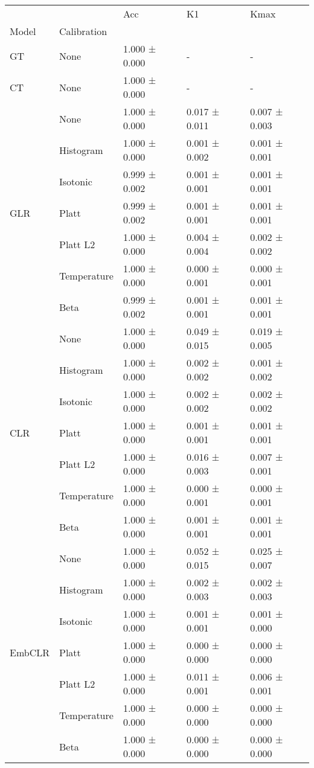 \begin{tabular}{lllll}
\toprule
 &  & Acc & K1 & Kmax \\
Model & Calibration &  &  &  \\
\midrule
GT & None & 1.000 ± 0.000 & - & - \\
\cline{1-5}
CT & None & 1.000 ± 0.000 & - & - \\
\cline{1-5}
\multirow[t]{7}{*}{GLR} & None & 1.000 ± 0.000 & 0.017 ± 0.011 & 0.007 ± 0.003 \\
 & Histogram & 1.000 ± 0.000 & 0.001 ± 0.002 & 0.001 ± 0.001 \\
 & Isotonic & 0.999 ± 0.002 & 0.001 ± 0.001 & 0.001 ± 0.001 \\
 & Platt & 0.999 ± 0.002 & 0.001 ± 0.001 & 0.001 ± 0.001 \\
 & Platt L2 & 1.000 ± 0.000 & 0.004 ± 0.004 & 0.002 ± 0.002 \\
 & Temperature & 1.000 ± 0.000 & 0.000 ± 0.001 & 0.000 ± 0.001 \\
 & Beta & 0.999 ± 0.002 & 0.001 ± 0.001 & 0.001 ± 0.001 \\
\cline{1-5}
\multirow[t]{7}{*}{CLR} & None & 1.000 ± 0.000 & 0.049 ± 0.015 & 0.019 ± 0.005 \\
 & Histogram & 1.000 ± 0.000 & 0.002 ± 0.002 & 0.001 ± 0.002 \\
 & Isotonic & 1.000 ± 0.000 & 0.002 ± 0.002 & 0.002 ± 0.002 \\
 & Platt & 1.000 ± 0.000 & 0.001 ± 0.001 & 0.001 ± 0.001 \\
 & Platt L2 & 1.000 ± 0.000 & 0.016 ± 0.003 & 0.007 ± 0.001 \\
 & Temperature & 1.000 ± 0.000 & 0.000 ± 0.001 & 0.000 ± 0.001 \\
 & Beta & 1.000 ± 0.000 & 0.001 ± 0.001 & 0.001 ± 0.001 \\
\cline{1-5}
\multirow[t]{7}{*}{EmbCLR} & None & 1.000 ± 0.000 & 0.052 ± 0.015 & 0.025 ± 0.007 \\
 & Histogram & 1.000 ± 0.000 & 0.002 ± 0.003 & 0.002 ± 0.003 \\
 & Isotonic & 1.000 ± 0.000 & 0.001 ± 0.001 & 0.001 ± 0.000 \\
 & Platt & 1.000 ± 0.000 & 0.000 ± 0.000 & 0.000 ± 0.000 \\
 & Platt L2 & 1.000 ± 0.000 & 0.011 ± 0.001 & 0.006 ± 0.001 \\
 & Temperature & 1.000 ± 0.000 & 0.000 ± 0.000 & 0.000 ± 0.000 \\
 & Beta & 1.000 ± 0.000 & 0.000 ± 0.000 & 0.000 ± 0.000 \\
\cline{1-5}
\bottomrule
\end{tabular}
